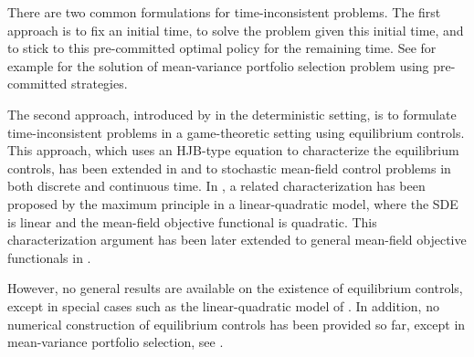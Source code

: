 \documentclass[12pt]{article}
\theoremstyle{named}
\numberwithin{equation}{section}
\let\oldcitet=\citet
\renewcommand{\cite}[1]{\textcolor[rgb]{0,0,1}{\oldcitet{#1}}}
\renewcommand{\citet}[1]{\textcolor[rgb]{0,0,1}{\oldcitet{#1}}}
\begin{document}
\medskip

There are two common formulations for time-inconsistent problems.
The first approach is to fix an initial time, to solve the problem given this
initial time, and to stick to this pre-committed optimal policy for the
remaining time.
See for example \cite{zhou2000continuous} for the solution
of mean-variance portfolio selection problem using pre-committed strategies.

\medskip

The second approach,
introduced by \cite{ekeland2006being} in the deterministic setting,
is to formulate time-inconsistent problems in a game-theoretic setting
using equilibrium controls.
This approach, which uses an HJB-type equation
to characterize the equilibrium controls,
has been extended in
 \cite{bjork2014theory} and \cite{bjork2017time}
 to stochastic mean-field control problems
  in both discrete and continuous time.
  In \cite{hu2012time,hu2017time},
a related characterization has been proposed
by the maximum principle in a linear-quadratic model,
where the SDE is linear and the mean-field objective functional is quadratic.
This characterization argument has been later
extended to general mean-field objective functionals
in \cite{djehiche2016characterization}.

\medskip

However, no general results are available on the
existence of equilibrium controls,
except
in special cases such as the linear-quadratic model of \cite{hu2012time}.
In addition,
no numerical construction of equilibrium controls has been provided so far,
 except in mean-variance portfolio selection, see \cite{wang2011continuous}.

 \medskip
\end{document}
